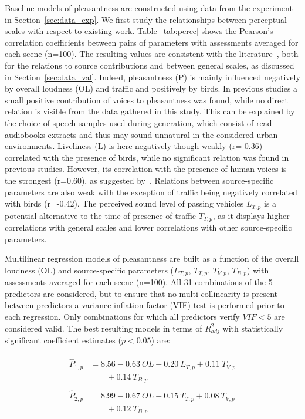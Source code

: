\documentclass[twocolumn]{article}
\begin{document}
Baseline models of pleasantness are constructed using data from the experiment in Section~\ref{sec:data_exp}. We first study the relationships between perceptual scales with respect to existing work. Table~\ref{tab:percc} shows the Pearson's correlation coefficients between pairs of parameters with assessments averaged for each scene (n=100). The resulting values are consistent with the literature~\cite{aumond2017, gontier2018}, both for the relations to source contributions and between general scales, as discussed in Section~\ref{sec:data_val}. Indeed, pleasantness (P) is mainly influenced negatively by overall loudness (OL) and traffic and positively by birds. In previous studies a small positive contribution of voices to pleasantness was found, while no direct relation is visible from the data gathered in this study. This can be explained by the choice of speech samples used during generation, which consist of read audiobooks extracts and thus may sound unnatural in the considered urban environments. Liveliness (L) is here negatively though weakly (r=-0.36) correlated with the presence of birds, while no significant relation was found in previous studies. However, its correlation with the presence of human voices is the strongest (r=0.60), as suggested by~\cite{axelsson2010}. Relations between source-specific parameters are also weak with the exception of traffic being negatively correlated with birds (r=-0.42). The perceived sound level of passing vehicles $L_{T, p}$ is a potential alternative to the time of presence of traffic $T_{T, p}$, as it displays higher correlations with general scales and lower correlations with other source-specific parameters.

Multilinear regression models of pleasantness are built as a function of the overall loudness (OL) and source-specific parameters ($L_{T, p}$, $T_{T, p}$, $T_{V, p}$, $T_{B, p}$) with assessments averaged for each scene (n=100). All 31 combinations of the 5 predictors are considered, but to ensure that no multi-collinearity is present between predictors a variance inflation factor (VIF) test is performed prior to each regression. Only combinations for which all predictors verify $VIF<5$ are considered valid. The best resulting models in terms of $R^2_{adj}$ with statistically significant coefficient estimates ($p<0.05$) are:

\begin{align}
\begin{split}
\hat P_{1, p} & = 8.56 - 0.63~OL - 0.20~L_{T, p} + 0.11~T_{V, p}\\
&\qquad + 0.14~T_{B, p} \label{eq:pp1}
\end{split}\\
\begin{split}
\hat P_{2, p} & = 8.99 - 0.67~OL - 0.15~T_{T, p} + 0.08~T_{V, p}\\
&\qquad + 0.12~T_{B, p} \label{eq:pp2}
\end{split}
\end{align}
\end{document}
